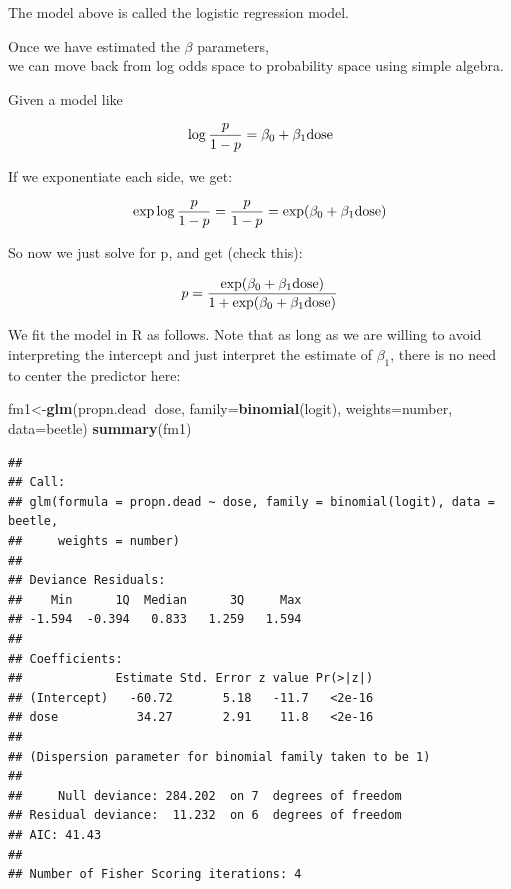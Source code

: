 \documentclass[12pt,]{krantz}
\newenvironment{Shaded}{\begin{snugshade}}{\end{snugshade}}
\newcommand{\DataTypeTok}[1]{\textcolor[rgb]{0.13,0.29,0.53}{#1}}
\newcommand{\KeywordTok}[1]{\textcolor[rgb]{0.13,0.29,0.53}{\textbf{#1}}}
\newcommand{\NormalTok}[1]{#1}
\newcommand{\OperatorTok}[1]{\textcolor[rgb]{0.81,0.36,0.00}{\textbf{#1}}}
\begin{document}
The model above is called the logistic regression model.

Once we have estimated the \(\beta\) parameters,\\
we can move back from log odds space to probability space using simple algebra.

Given a model like

\begin{equation}
\log \frac{p}{1-p} = \beta_0 + \beta_1 \hbox{dose}
\end{equation}

If we exponentiate each side, we get:

\begin{equation}
\exp \log \frac{p}{1-p} = \frac{p}{1-p} = \exp( \beta_0 + \beta_1 \hbox{dose})
\end{equation}

So now we just solve for p, and get (check this):

\begin{equation} \label{problogisticregression}
p = \frac{\exp( \beta_0 + \beta_1 \hbox{dose})}{1+\exp( \beta_0 + \beta_1 \hbox{dose})}
\end{equation}

We fit the model in R as follows. Note that as long as we are willing to avoid interpreting the intercept and just interpret the estimate of \(\beta_1\), there is no need to center the predictor here:

\begin{Shaded}
\begin{Highlighting}[]
\NormalTok{fm1<-}\KeywordTok{glm}\NormalTok{(propn.dead}\OperatorTok{~}\NormalTok{dose,}
         \DataTypeTok{family=}\KeywordTok{binomial}\NormalTok{(logit),}
         \DataTypeTok{weights=}\NormalTok{number,}
         \DataTypeTok{data=}\NormalTok{beetle)}
\KeywordTok{summary}\NormalTok{(fm1)}
\end{Highlighting}
\end{Shaded}

\begin{verbatim}
## 
## Call:
## glm(formula = propn.dead ~ dose, family = binomial(logit), data = beetle, 
##     weights = number)
## 
## Deviance Residuals: 
##    Min      1Q  Median      3Q     Max  
## -1.594  -0.394   0.833   1.259   1.594  
## 
## Coefficients:
##             Estimate Std. Error z value Pr(>|z|)
## (Intercept)   -60.72       5.18   -11.7   <2e-16
## dose           34.27       2.91    11.8   <2e-16
## 
## (Dispersion parameter for binomial family taken to be 1)
## 
##     Null deviance: 284.202  on 7  degrees of freedom
## Residual deviance:  11.232  on 6  degrees of freedom
## AIC: 41.43
## 
## Number of Fisher Scoring iterations: 4
\end{verbatim}
\end{document}
